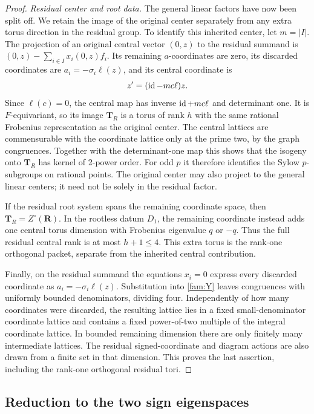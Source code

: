 \begin{proof}
\smallskip\noindent\emph{Residual center and root data.}
The general linear factors have now been split off.  We retain
the image of the original center separately from any extra torus
direction in the residual group.
To identify this inherited center, let \(m=|I|\).  The projection
of an original central vector \((0,z)\) to the residual summand is
\((0,z)-\sum_{i\in I}x_i(0,z)f_i\).  Its remaining
\(a\)-coordinates are zero, its discarded coordinates are
\(a_i=-\sigma_i\ell(z)\), and its central coordinate is
\[
 z'=(\operatorname{id}-mc\ell)z.
\]
Since \(\ell(c)=0\), the central map has inverse \(\operatorname{id}+mc\ell\)
and determinant one.  It is \(F\)-equivariant, so its image
\(\mathbf T_R\) is a torus of rank \(h\) with the same rational
Frobenius representation as the original center.  The central
lattices are commensurable with the coordinate lattice only at
the prime two, by the graph congruences.  Together with the
determinant-one map this shows that the isogeny onto
\(\mathbf T_R\) has kernel of 2-power order.  For odd \(p\)
it therefore identifies the Sylow \(p\)-subgroups on rational
points.  The original center may also project to the general
linear centers; it need not lie solely in the residual factor.

If the residual root system spans the remaining coordinate
space, then \(\mathbf T_R=Z^\circ(\mathbf R)\).  In the
rootless datum \(D_1\), the remaining coordinate instead adds
one central torus dimension with Frobenius eigenvalue \(q\)
or \(-q\).  Thus the full residual central rank is at most
\(h+1\leq4\).  This extra torus is the rank-one orthogonal
packet, separate from the inherited central contribution.

Finally, on the residual summand the equations \(x_i=0\) express
every discarded coordinate as \(a_i=-\sigma_i\ell(z)\).
Substitution into \eqref{fam:Y} leaves congruences with uniformly
bounded denominators, dividing four.  Independently of how many
coordinates were discarded, the resulting lattice lies in a
fixed small-denominator coordinate lattice and contains a fixed
power-of-two multiple of the integral coordinate lattice.  In
bounded remaining dimension there are only finitely many intermediate
lattices.  The residual signed-coordinate and diagram actions are
also drawn from a finite set in that dimension.  This proves the
last assertion, including the rank-one orthogonal residual tori.
\end{proof}

\subsection{Reduction to the two sign eigenspaces}

